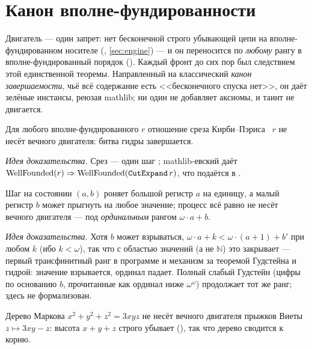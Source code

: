 \section{Канон вполне-фундированности}\label{sec:wellfounded}

Двигатель --- один запрет: нет бесконечной строго убывающей цепи на вполне-фундированном носителе
(, \cref{sec:engine}) --- и он переносится по \emph{любому}
рангу в вполне-фундированный порядок (). Каждый фронт до сих пор
был следствием этой единственной теоремы. Направленный на классический \emph{канон завершаемости}, чьё
всё содержание есть <<бесконечного спуска нет>>, он даёт зелёные инстансы, реюзая mathlib; ни один не
добавляет аксиомы, и таинт не двигается.

\begin{theorem}\label{thm:hydra_no_perpetual_engine}
\green{} Для любого вполне-фундированного $r$ отношение среза Кирби--Пэриса ~$r$
не несёт вечного двигателя: битва гидры завершается.
\end{theorem}

\emph{Идея доказательства.} Срез --- один шаг ; mathlib-евский 
даёт $\mathrm{WellFounded}(r) \Rightarrow \mathrm{WellFounded}(\texttt{CutExpand}\,r)$, что подаётся в
.

\begin{theorem}\label{thm:omega_worm_no_perpetual_engine}
\green{} Шаг на состоянии $(a,b)$ роняет большой регистр $a$ на единицу, а малый регистр $b$ может
прыгнуть на любое значение; процесс всё равно не несёт вечного двигателя --- под \emph{ординальным}
рангом $\omega\cdot a + b$.
\end{theorem}

\emph{Идея доказательства.} Хотя $b$ может взрываться, $\omega\cdot a + k < \omega\cdot(a+1) + b'$ при
любом $k$ (ибо $k < \omega$), так что  с областью значений
 (а не $\mathbb{N}$) это закрывает --- первый трансфинитный ранг в программе и механизм за
теоремой Гудстейна и гидрой: значение взрывается, ординал падает. Полный слабый Гудстейн (цифры по
основанию $b$, прочитанные как ординал ниже $\omega^\omega$) продолжает тот же ранг; здесь не
формализован.

\begin{theorem}\label{thm:markov_no_perpetual_engine}
\green{} Дерево Маркова $x^2+y^2+z^2=3xyz$ не несёт вечного двигателя прыжков Виеты $z \mapsto 3xy-z$:
высота $x+y+z$ строго убывает (), так что дерево сводится к корню.
\end{theorem}

